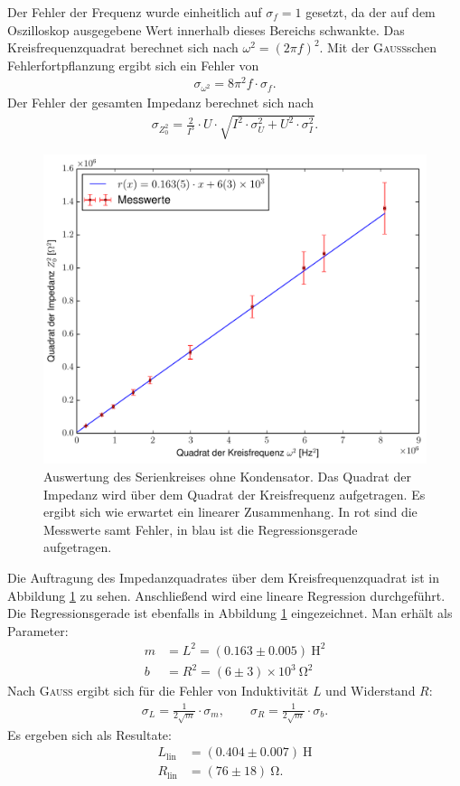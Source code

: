 \documentclass[12pt,a4paper,titlepage,headinclude]{scrartcl}
\numberwithin{equation}{subsection}
\newcommand{\mrm}[1]{\mathrm{#1}}
\newcommand{\person}[1]{\textsc{#1}}
\begin{document}
Der Fehler der Frequenz wurde einheitlich auf $\sigma_f=1$ gesetzt, da der auf dem Oszilloskop ausgegebene Wert innerhalb dieses Bereichs schwankte. Das Kreisfrequenzquadrat berechnet sich nach $\omega^2=\left( 2\pi f \right)^2$. Mit der \person{Gauss}schen Fehlerfortpflanzung ergibt sich ein Fehler von 
\begin{align}
	\sigma_{\omega^2}=8  \pi^{2}  f\cdot \sigma_{f}.
	\label{eq:sigmaomega}
\end{align}
 Der Fehler der gesamten Impedanz berechnet sich nach
\begin{align}
	\sigma_{Z_0^2}=\frac{2}{I^{3}} \cdot U \cdot \sqrt{I^{2} \cdot \sigma_{U}^{2} + U^{2} \cdot \sigma_{I}^{2}}.
	\label{eq:sigmaz0}
\end{align}
\begin{figure}[h!]
	\centering
	\includegraphics[width=\textwidth]{plot1.pdf}
	\caption{Auswertung des Serienkreises ohne Kondensator. Das Quadrat der Impedanz wird über dem Quadrat der Kreisfrequenz aufgetragen. Es ergibt sich wie erwartet ein linearer Zusammenhang. In rot sind die Messwerte samt Fehler, in blau ist die Regressionsgerade aufgetragen.}
	\label{fig:plot1}
\end{figure}

Die Auftragung des Impedanzquadrates über dem Kreisfrequenzquadrat ist in Abbildung \ref{fig:plot1} zu sehen. Anschließend wird eine lineare Regression durchgeführt. Die Regressionsgerade ist ebenfalls in Abbildung \ref{fig:plot1} eingezeichnet. Man erhält als Parameter:
\begin{align}
	m&=L^2=(0.163\pm0.005)~\mrm{H}^2\\
	b&=R^2=(6\pm3)\times 10^3~\mrm{\Omega}^2
	\label{eq:plot1}
\end{align}
Nach \person{Gauss} ergibt sich für die Fehler von Induktivität $L$ und Widerstand $R$:
\begin{align}
	\sigma_L=\frac{1}{2\sqrt{m}}\cdot\sigma_m,\qquad\sigma_R=\frac{1}{2\sqrt{m}}\cdot\sigma_b.
	\label{eq:sigma1}
\end{align}
Es ergeben sich als Resultate:
\begin{align}
	L_{\mrm{lin}}&=(0.404\pm0.007)~\mrm{H}\\
	R_{\mrm{lin}}&=(76\pm18)~\mrm{\Omega}.
	\label{eq:result1}
\end{align}
\newpage
\end{document}

